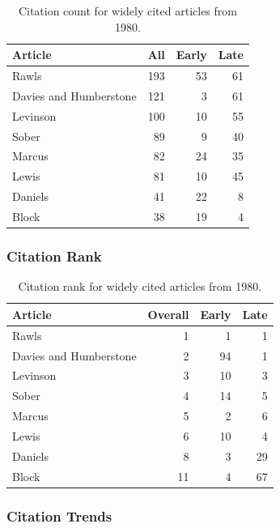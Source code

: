 \documentclass[
  10pt,
  letterpaper,
  DIV=11,
  numbers=noendperiod,
  twoside]{scrartcl}
\begin{document}
\begin{longtable}[]{@{}lrrr@{}}

\caption{\label{tbl-citation-count-1980}Citation count for widely cited
articles from 1980.}

\tabularnewline

\toprule\noalign{}
Article & All & Early & Late \\
\midrule\noalign{}
\endhead
\bottomrule\noalign{}
\endlastfoot
Rawls & 193 & 53 & 61 \\
Davies and Humberstone & 121 & 3 & 61 \\
Levinson & 100 & 10 & 55 \\
Sober & 89 & 9 & 40 \\
Marcus & 82 & 24 & 35 \\
Lewis & 81 & 10 & 45 \\
Daniels & 41 & 22 & 8 \\
Block & 38 & 19 & 4 \\

\end{longtable}

\subsubsection*{Citation Rank}\label{sec-rank-1980}

\begin{longtable}[]{@{}lrrr@{}}

\caption{\label{tbl-citation-rank-1980}Citation rank for widely cited
articles from 1980.}

\tabularnewline

\toprule\noalign{}
Article & Overall & Early & Late \\
\midrule\noalign{}
\endhead
\bottomrule\noalign{}
\endlastfoot
Rawls & 1 & 1 & 1 \\
Davies and Humberstone & 2 & 94 & 1 \\
Levinson & 3 & 10 & 3 \\
Sober & 4 & 14 & 5 \\
Marcus & 5 & 2 & 6 \\
Lewis & 6 & 10 & 4 \\
Daniels & 8 & 3 & 29 \\
Block & 11 & 4 & 67 \\

\end{longtable}

\subsubsection*{Citation Trends}\label{sec-trends-1980}
\end{document}
